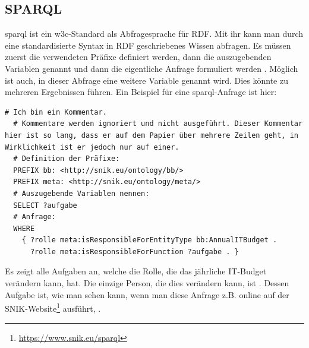 \subsection{SPARQL}\label{sub:sparql}

\ac{sparql} ist ein \ac{w3c}-Standard als Abfragesprache für RDF.
Mit ihr kann man durch eine standardisierte Syntax in RDF geschriebenes Wissen abfragen.
Es müssen zuerst die verwendeten Präfixe definiert werden, dann die auszugebenden Variablen genannt und dann die eigentliche Anfrage formuliert werden \citep[S.~203]{semanticwebgrundlagen}.
Möglich ist auch, in dieser Abfrage eine weitere Variable genannt wird.
Dies könnte zu mehreren Ergebnissen führen.
Ein Beispiel für eine \ac{sparql}-Anfrage ist hier:

\begin{lstlisting}[language=SPARQL]
  # Ich bin ein Kommentar.
  # Kommentare werden ignoriert und nicht ausgeführt. Dieser Kommentar hier ist so lang, dass er auf dem Papier über mehrere Zeilen geht, in Wirklichkeit ist er jedoch nur auf einer.
  # Definition der Präfixe:
  PREFIX bb: <http://snik.eu/ontology/bb/>
  PREFIX meta: <http://snik.eu/ontology/meta/>
  # Auszugebende Variablen nennen:
  SELECT ?aufgabe
  # Anfrage:
  WHERE
    { ?rolle meta:isResponsibleForEntityType bb:AnnualITBudget .
      ?rolle meta:isResponsibleForFunction ?aufgabe . }
\end{lstlisting}
Es zeigt alle Aufgaben an, welche die Rolle, die das jährliche IT-Budget verändern kann, hat.
Die einzige Person, die dies verändern kann, ist .
Dessen Aufgabe ist, wie man sehen kann, wenn man diese Anfrage z.B. online auf der SNIK-Website\footnote{\url{https://www.snik.eu/sparql}} ausführt, .

